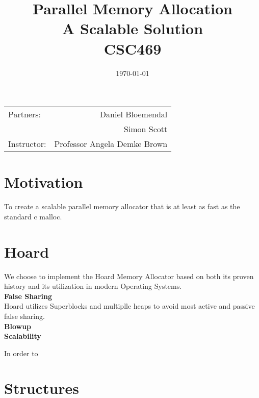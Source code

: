\documentclass[11pt]{article}
\title{Parallel Memory Allocation \\ A Scalable Solution \\ CSC469} %
\date{\today} %
\begin{document}
\maketitle %

\begin{center}
\begin{tabular}{l r}
Partners: & Daniel Bloemendal \\ %
& Simon Scott \\
Instructor: & Professor Angela Demke Brown %
\end{tabular}
\end{center}



\section{Motivation}

To create a scalable parallel memory allocator that is at least as fast as the standard c malloc.


\section{Hoard}

\indent \indent We choose to implement the Hoard Memory Allocator based on both its proven history and its utilization in modern Operating Systems. 
\\
\textbf{False Sharing}
\\
\indent Hoard utilizes Superblocks and multiplle heaps to avoid most active and passive false sharing. 
\\
\textbf{Blowup}
\\
\textbf{Scalability}

	In order to 
\section{Structures}
\end{document}
